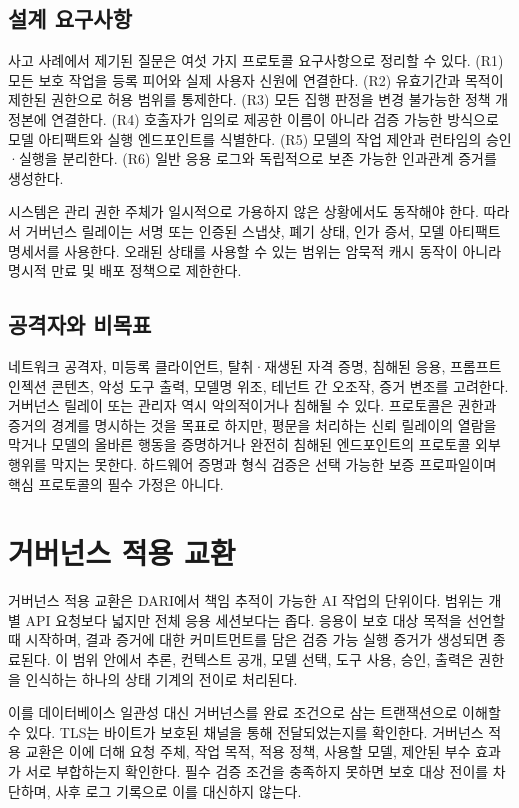 \documentclass[10pt]{article}
\begin{document}
\subsection{설계 요구사항}

사고 사례에서 제기된 질문은 여섯 가지 프로토콜 요구사항으로 정리할 수 있다. (R1) 모든 보호 작업을 등록 피어와 실제 사용자 신원에 연결한다. (R2) 유효기간과 목적이 제한된 권한으로 허용 범위를 통제한다. (R3) 모든 집행 판정을 변경 불가능한 정책 개정본에 연결한다. (R4) 호출자가 임의로 제공한 이름이 아니라 검증 가능한 방식으로 모델 아티팩트와 실행 엔드포인트를 식별한다. (R5) 모델의 작업 제안과 런타임의 승인·실행을 분리한다. (R6) 일반 응용 로그와 독립적으로 보존 가능한 인과관계 증거를 생성한다.

시스템은 관리 권한 주체가 일시적으로 가용하지 않은 상황에서도 동작해야 한다. 따라서 거버넌스 릴레이는 서명 또는 인증된 스냅샷, 폐기 상태, 인가 증서, 모델 아티팩트 명세서를 사용한다. 오래된 상태를 사용할 수 있는 범위는 암묵적 캐시 동작이 아니라 명시적 만료 및 배포 정책으로 제한한다.

\subsection{공격자와 비목표}

네트워크 공격자, 미등록 클라이언트, 탈취·재생된 자격 증명, 침해된 응용, 프롬프트 인젝션 콘텐츠, 악성 도구 출력, 모델명 위조, 테넌트 간 오조작, 증거 변조를 고려한다. 거버넌스 릴레이 또는 관리자 역시 악의적이거나 침해될 수 있다. 프로토콜은 권한과 증거의 경계를 명시하는 것을 목표로 하지만, 평문을 처리하는 신뢰 릴레이의 열람을 막거나 모델의 올바른 행동을 증명하거나 완전히 침해된 엔드포인트의 프로토콜 외부 행위를 막지는 못한다. 하드웨어 증명과 형식 검증은 선택 가능한 보증 프로파일이며 핵심 프로토콜의 필수 가정은 아니다.

\section{거버넌스 적용 교환}

거버넌스 적용 교환은 DARI에서 책임 추적이 가능한 AI 작업의 단위이다. 범위는 개별 API 요청보다 넓지만 전체 응용 세션보다는 좁다. 응용이 보호 대상 목적을 선언할 때 시작하며, 결과 증거에 대한 커미트먼트를 담은 검증 가능 실행 증거가 생성되면 종료된다. 이 범위 안에서 추론, 컨텍스트 공개, 모델 선택, 도구 사용, 승인, 출력은 권한을 인식하는 하나의 상태 기계의 전이로 처리된다.

이를 데이터베이스 일관성 대신 거버넌스를 완료 조건으로 삼는 트랜잭션으로 이해할 수 있다. TLS는 바이트가 보호된 채널을 통해 전달되었는지를 확인한다. 거버넌스 적용 교환은 이에 더해 요청 주체, 작업 목적, 적용 정책, 사용할 모델, 제안된 부수 효과가 서로 부합하는지 확인한다. 필수 검증 조건을 충족하지 못하면 보호 대상 전이를 차단하며, 사후 로그 기록으로 이를 대신하지 않는다.
\end{document}
